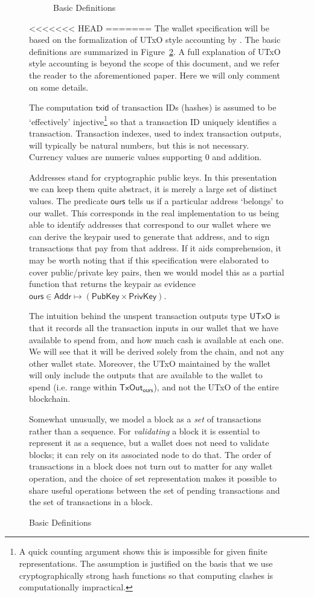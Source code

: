 \documentclass{article}
\theoremstyle{definition}{
  \newtheorem{lemma}{Lemma}[section] %
  \newtheorem{definition}[lemma]{Definition}
}
\theoremstyle{theorem}{
  \newtheorem{invariant}[lemma]{Invariant}
  \newtheorem{proofobligation}[lemma]{Proof Obligation}
}
\numberwithin{equation}{lemma}
\begin{document}
\begin{figure}
\begin{figure}
\caption{\label{fig:basic_definitions}Basic Definitions}
\end{figure}

<<<<<<< HEAD
=======
The wallet specification will be based on the formalization of UTxO style
accounting by \cite{utxo_accounting}. The basic definitions are summarized in
Figure~\ref{fig:basic_definitions}. A full explanation of UTxO style accounting
is beyond the scope of this document, and we refer the reader to the
aforementioned paper. Here we will only comment on some details.

The computation $\mathsf{txid}$ of transaction IDs (hashes) is assumed to be
`effectively' injective\footnote{A quick counting argument shows this is
impossible for given finite representations. The assumption is justified on the
basis that we use cryptographically strong hash functions so that computing
clashes is computationally impractical.} so that a transaction ID uniquely
identifies a transaction. Transaction indexes, used to index transaction
outputs, will typically be natural numbers, but this is not necessary. Currency
values are numeric values supporting 0 and addition.

Addresses stand for cryptographic public keys. In this presentation we can keep
them quite abstract, it is merely a large set of distinct values. The predicate
$\mathsf{ours}$ tells us if a particular address `belongs' to our wallet.
This corresponds in the real implementation to us being able to identify
addresses that correspond to our wallet where we can derive the keypair used
to generate that address, and to sign transactions that pay from that address.
If it aids comprehension, it may be worth noting that if this specification
were elaborated to cover public/private key pairs, then we would model this as
a partial function that returns the keypair as evidence
$\mathsf{ours} \in \mathsf{Addr} \mapsto (\mathsf{PubKey} \times \mathsf{PrivKey})$.

The intuition behind the unspent transaction outputs type $\mathsf{UTxO}$ is
that it records all the transaction inputs in our wallet that we have available
to spend from, and how much cash is available at each one. We will see that it
will be derived solely from the chain, and not any other wallet state. Moreover,
the UTxO maintained by the wallet will only include the outputs that are
available to the wallet to spend (i.e. range within $\mathsf{TxOut_{ours}}$),
and not the UTxO of the entire blockchain.

Somewhat unusually, we model a block as a \emph{set} of transactions rather than
a sequence. For \emph{validating} a block it is essential to represent it as a
sequence, but a wallet does not need to validate blocks; it can rely on its
associated node to do that. The order of transactions in a block does not turn
out to matter for any wallet operation, and the choice of set representation
makes it possible to share useful operations between the set of pending
transactions and the set of transactions in a block.


\end{figure}
\end{document}

